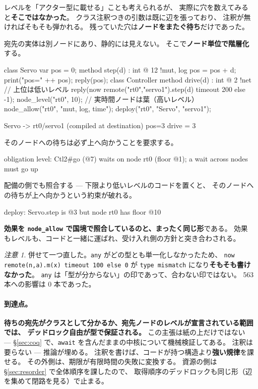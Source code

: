 \documentclass[11pt,a4paper]{ltjsarticle}
\theoremstyle{definition}
\theoremstyle{remark}
\newtheorem{remark}[theorem]{注意}
\begin{document}
レベルを「アクター型に載せる」ことも考えられるが、
実際に穴を数えてみると\textbf{そこではなかった}。
クラス注釈つきの引数は既に辺を張っており、
注釈が無ければそもそも弾かれる。
残っていた穴は\textbf{ノードをまたぐ待ち}だけであった。

宛先の実体は別ノードにあり、静的には見えない。
そこで\textbf{ノード単位で階層化}する。

\begin{aipl}
class Servo {
  var pos = 0;
  method step(d) : int @ 12 !{mut, log} { pos = pos + d; print("pos=" ++ pos); reply(pos); }
}
class Controller {
  method drive(d) : int @ 2 !{net} {          // 上位は低いレベル
    reply(now remote("rt0","servo1").step(d) timeout 200 else -1);
  }
}
node_level("rt0", 10);              // 実時間ノードは葉（高いレベル）
node_allow("rt0", "mut, log, time");
deploy("rt0", "Servo", "servo1");
\end{aipl}
\begin{term}
[deploy] Servo -> rt0/servo1 (compiled at destination)
pos=3
drive = 3
\end{term}

そのノードへの待ちは必ず上へ向かうことを要求する。

\begin{term}
 obligation level: Ctl2#go (@7) waits on node rt0 (floor @1);
             a wait across nodes must go up
\end{term}

配備の側でも照合する --- 下限より低いレベルのコードを置くと、
そのノードへの待ちが上へ向かうという約束が破れる。

\begin{term}
deploy: Servo.step is @3 but node rt0 has floor @10
\end{term}

\textbf{効果を \texttt{node\_allow} で国境で照合しているのと、まったく同じ形}である。
効果もレベルも、コードと一緒に運ばれ、受け入れ側の方針と突き合わされる。

\begin{remark}
併せて一つ直した。\texttt{any} がどの型とも単一化しなかったため、
\texttt{now remote(n,a).m(x) timeout 100 else 0} が
\texttt{type mismatch} になり\textbf{そもそも書けなかった}。
\texttt{any} は「型が分からない」の印であって、合わない印ではない。
563 本への影響は 0 本であった。
\end{remark}

\paragraph{到達点。}
\textbf{待ちの宛先がクラスとして分かるか、宛先ノードのレベルが宣言されている範囲では、
デッドロック自由が型で保証される。}
この主張は紙の上だけではない ---
\S\ref{sec:coq} で、\texttt{await} を含んだままの中核について機械検証してある。
注釈は要らない --- 推論が埋める。
注釈を書けば、コードが持つ構造より\textbf{強い規律}を課せる。
その外側は、期限が有限時間の失敗に変換する。
資源の側は \S\ref{sec:resorder} で全体順序を課したので、
取得順序のデッドロックも同じ形（辺を集めて閉路を見る）で止まる。
\end{document}
